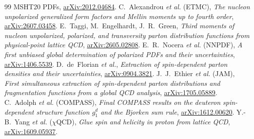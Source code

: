\documentclass[11pt,a4paper]{article}
\begin{document}
\begin{thebibliography}{99}
{  MSHT20 PDFs}, \href{https://arxiv.org/abs/2012.04684}{arXiv:2012.04684}.
 C.~Alexandrou \emph{et al.} (ETMC), \emph{The nucleon unpolarized generalized form factors and
  Mellin moments up to fourth order}, \href{https://arxiv.org/abs/2607.03458}{arXiv:2607.03458}.
 E.~Taggi, M.~Engelhardt, J.~R.~Green, \emph{Third moments of nucleon unpolarized, polarized, and
  transversity parton distribution functions from physical-point lattice QCD},
  \href{https://arxiv.org/abs/2605.02808}{arXiv:2605.02808}.
 E.~R.~Nocera \emph{et al.} (NNPDF), \emph{A first unbiased global determination of polarized PDFs
  and their uncertainties}, \href{https://arxiv.org/abs/1406.5539}{arXiv:1406.5539}.
 D.~de~Florian \emph{et al.}, \emph{Extraction of spin-dependent parton densities and their
  uncertainties}, \href{https://arxiv.org/abs/0904.3821}{arXiv:0904.3821}.
 J.~J.~Ethier \emph{et al.} (JAM), \emph{First simultaneous extraction of spin-dependent parton
  distributions and fragmentation functions from a global QCD analysis},
  \href{https://arxiv.org/abs/1705.05889}{arXiv:1705.05889}.
 C.~Adolph \emph{et al.} (COMPASS), \emph{Final COMPASS results on the deuteron spin-dependent
  structure function $g_1^d$ and the Bjorken sum rule}, \href{https://arxiv.org/abs/1612.00620}{arXiv:1612.00620}.
 Y.-B.~Yang \emph{et al.} ($\chi$QCD), \emph{Glue spin and helicity in proton from lattice QCD},
  \href{https://arxiv.org/abs/1609.05937}{arXiv:1609.05937}.
\end{thebibliography}
\end{document}
